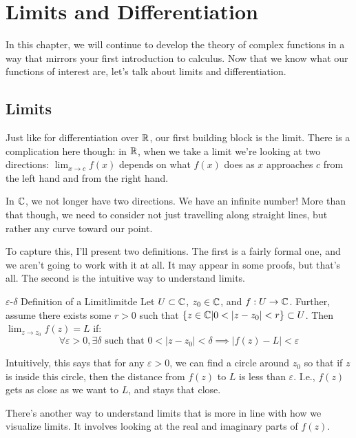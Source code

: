 \chapter{Limits and Differentiation}

In this chapter, we will continue to develop the theory of complex functions in a way that mirrors your first introduction to calculus. Now that we know what our functions of interest are, let's talk about limits and differentiation.

\section{Limits}

Just like for differentiation over $\mathbb{R}$, our first building block is the limit. There is a complication here though: in $\mathbb{R}$, when we take a limit we're looking at two directions: $\lim_{x\rightarrow c} f(x)$ depends on what $f(x)$ does as $x$ approaches $c$ from the left hand and from the right hand.

In $\mathbb{C}$, we not longer have two directions. We have an infinite number! More than that though, we need to consider not just travelling along straight lines, but rather any curve toward our point.

To capture this, I'll present two definitions. The first is a fairly formal one, and we aren't going to work with it at all. It may appear in some proofs, but that's all. The second is the intuitive way to understand limits.

\begin{defbo}{$\varepsilon$-$\delta$ Definition of a Limit}{limitde}
Let $U\subset \mathbb{C}$, $z_0 \in \mathbb{C}$, and $f:U\rightarrow \mathbb{C}$. Further, assume there exists some $r > 0$ such that $\{z\in \mathbb{C}| 0 < |z-z_0| < r\} \subset U$. Then $\displaystyle\lim_{z\rightarrow z_0} f(z) = L$ if:
$$\forall \varepsilon > 0, \exists \delta \text{ such that } 0 < |z-z_0| < \delta \implies |f(z) - L| < \varepsilon$$
\end{defbo}

Intuitively, this says that for any $\varepsilon > 0$, we can find a circle around $z_0$ so that if $z$ is inside this circle, then the distance from $f(z)$ to $L$ is less than $\varepsilon$. I.e., $f(z)$ gets as close as we want to $L$, and stays that close.

There's another way to understand limits that is more in line with how we visualize limits. It involves looking at the real and imaginary parts of $f(z)$.

